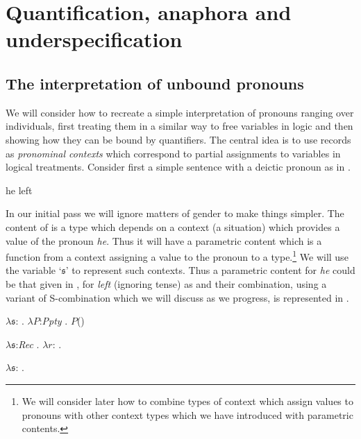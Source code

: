 \chapter{Quantification, anaphora and underspecification}
\label{ch:quant}
\setcounter{equation}{0}

\section{The interpretation of unbound pronouns}
We will consider how to recreate a simple interpretation of pronouns
ranging over individuals, first treating them in a similar way to free
variables in logic and then showing how they can be bound by
quantifiers.  The central idea is to use records as \textit{pronominal
  contexts} which correspond to partial assignments to variables in
logical treatments.  Consider first a simple sentence with a deictic
pronoun as in \nexteg{}.
\begin{ex} 
he left 
\end{ex} 
In our initial pass we will ignore matters
of gender to make things simpler.  The content of \preveg{} is a type
which depends on a context (a situation) which provides a value of the
pronoun \textit{he}. Thus it will have a parametric content which is a
function from a context assigning a value to the pronoun to a
type.\footnote{We will consider later how to combine types of context
  which assign values to pronouns with other context types which we
  have introduced with parametric contents.}  We will use the variable
`$\mathfrak{s}$' to represent such contexts.  Thus a parametric content for
\textit{he} could be that given in , for \textit{left}
(ignoring tense) as  and their combination, using a variant
of S-combination which we will discuss as we progress, is represented
in .
\begin{ex} 
\begin{subex} 
 
\item $\lambda\mathfrak{s}$: . 
        $\lambda P$:\textit{Ppty} . $P$()
 
\item $\lambda\mathfrak{s}$:\textit{Rec} . 
        $\lambda r$: . 

\item $\lambda\mathfrak{s}$:
  . 
 
\end{subex} 
   
\end{ex}
